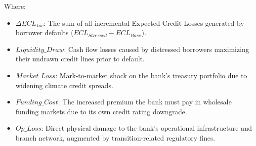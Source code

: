 \documentclass[11pt]{article}
\begin{document}
Where:
\begin{itemize}
    \item $\Delta ECL_{Inc}$: The sum of all incremental Expected Credit Losses generated by borrower defaults ($ECL_{Stressed} - ECL_{Base}$).
    \item $Liquidity\_Draw$: Cash flow losses caused by distressed borrowers maximizing their undrawn credit lines prior to default.
    \item $Market\_Loss$: Mark-to-market shock on the bank's treasury portfolio due to widening climate credit spreads.
    \item $Funding\_Cost$: The increased premium the bank must pay in wholesale funding markets due to its own credit rating downgrade.
    \item $Op\_Loss$: Direct physical damage to the bank's operational infrastructure and branch network, augmented by transition-related regulatory fines.
\end{itemize}
\end{document}
